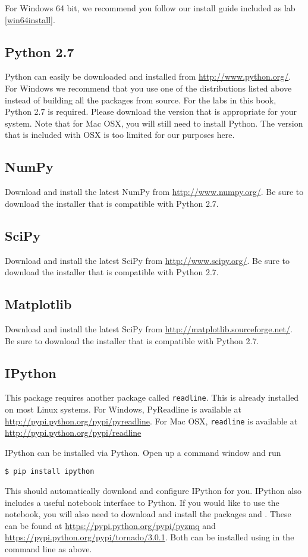 For Windows 64 bit, we recommend you follow our install guide included as lab \ref{win64install}.

\subsection*{Python 2.7}
Python can easily be downloaded and installed from \url{http://www.python.org/}.
For Windows we recommend that you use one of the distributions listed above instead of building all the packages from source.
For the labs in this book, Python 2.7 is required.
Please download the version that is appropriate for your system.
Note that for Mac OSX, you will still need to install Python.
The version that is included with OSX is too limited for our purposes here.

\subsection*{NumPy}
Download and install the latest NumPy from \url{http://www.numpy.org/}.  
Be sure to download the installer that is compatible with Python 2.7.

\subsection*{SciPy}
Download and install the latest SciPy from \url{http://www.scipy.org/}. 
Be sure to download the installer that is compatible with Python 2.7.

\subsection*{Matplotlib}
Download and install the latest SciPy from \url{http://matplotlib.sourceforge.net/}.
Be sure to download the installer that is compatible with Python 2.7.

\subsection*{IPython}
This package requires another package called \texttt{readline}.
This is already installed on most Linux systems. 
For Windows, PyReadline is available at \url{http://pypi.python.org/pypi/pyreadline}.
For Mac OSX, \texttt{readline} is available at \url{http://pypi.python.org/pypi/readline}

IPython can be installed via Python.
Open up a command window and run
\begin{lstlisting}
$ pip install ipython
\end{lstlisting}
This should automatically download and configure IPython for you.
IPython also includes a useful notebook interface to Python.
If you would like to use the notebook, you will also need to download and install the packages  and .
These can be found at \url{https://pypi.python.org/pypi/pyzmq} and \url{https://pypi.python.org/pypi/tornado/3.0.1}.
Both can be installed using  in the command line as above.

